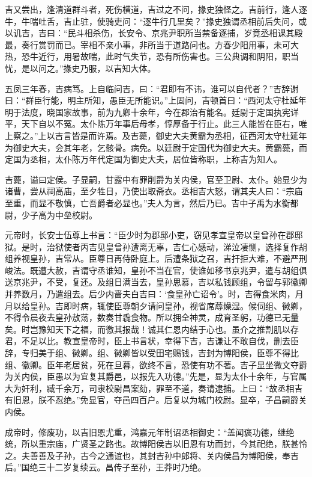 \documentclass[12pt,UTF8]{ctexbook}
\begin{document}
吉又尝出，逢清道群斗者，死伤横道，吉过之不问，掾史独怪之。吉前行，逢人逐牛，牛喘吐舌，吉止驻，使骑吏问：“逐牛行几里矣？”掾史独谓丞相前后失问，或以讥吉，吉曰：“民斗相杀伤，长安令、京兆尹职所当禁备逐捕，岁竟丞相课其殿最，奏行赏罚而已。宰相不亲小事，非所当于道路问也。方春少阳用事，未可大热，恐牛近行，用暑故喘，此时气失节，恐有所伤害也。三公典调和阴阳，职当忧，是以问之。”掾史乃服，以吉知大体。



五凤三年春，吉病笃。上自临问吉，曰：“君即有不讳，谁可以自代者？”吉辞谢曰：“群臣行能，明主所知，愚臣无所能识。”上固问，吉顿首曰：“西河太守杜延年明于法度，晓国家故事，前为九卿十余年，今在郡治有能名。廷尉于定国执宪详平，天下自以不冤。太仆陈万年事后母孝，惇厚备于行止。此三人能皆在臣右，唯上察之。”上以吉言皆是而许焉。及吉薨，御史大夫黄霸为丞相，征西河太守杜延年为御史大夫，会其年老，乞骸骨。病免。以廷尉于定国代为御史大夫。黄霸薨，而定国为丞相，太仆陈万年代定国为御史大夫，居位皆称职，上称吉为知人。



吉薨，谥曰定侯。子显嗣，甘露中有罪削爵为关内侯，官至卫尉、太仆。始显少为诸曹，尝从祠高庙，至夕牲日，乃使出取斋衣。丞相吉大怒，谓其夫人曰：“宗庙至重，而显不敬慎，亡吾爵者必显也。”夫人为言，然后乃已。吉中子禹为水衡都尉，少子高为中垒校尉。



元帝时，长安士伍尊上书言：“臣少时为郡邸小吏，窃见孝宣皇帝以皇曾孙在郡邸狱。是时，治狱使者丙吉见皇曾孙遭离无辜，吉仁心感动，涕泣凄恻，选择复作胡组养视皇孙，吉常从。臣尊日再侍卧庭上。后遭条狱之召，吉扞拒大难，不避严刑峻法。既遭大赦，吉谓守丞谁知，皇孙不当在官，使谁如移书京兆尹，遣与胡组俱送京兆尹，不受，复还。及组日满当去，皇孙思慕，吉以私钱顾组，令留与郭徽卿并养数月，乃遣组去。后少内啬夫白吉曰：‘食皇孙亡诏令’。时，吉得食米肉，月月以给皇孙。吉即时病，辄使臣尊朝夕请问皇孙，视省席蓐燥湿。候伺组、徽卿，不得令晨夜去皇孙敖荡，数奏甘毳食物。所以拥全神灵，成育圣躬，功德已无量矣。时岂豫知天下之福，而徼其报哉！诚其仁恩内结于心也。虽介之推割肌以存君，不足以比。教宣皇帝时，臣上书言状，幸得下吉，吉谦让不敢自伐，删去臣辞，专归美于组、徽卿。组、徽卿皆以受田宅赐钱，吉封为博阳侯，臣尊不得比组、徽卿。臣年老居贫，死在旦暮，欲终不言，恐使有功不著。吉子显坐微文夺爵为关内侯，臣愚以为宜复其爵邑，以报先入功德。”先是，显为太仆十余年，与官属大为奸利，臧千余万，司隶校尉昌案劾，罪至不道，奏请逮捕。上曰：“故丞相吉有旧恩，朕不忍绝。”免显官，夺邑四百户。后复以为城门校尉。显卒，子昌嗣爵关内侯。



成帝时，修废功，以吉旧恩尤重，鸿嘉元年制诏丞相御史：“盖闻褒功德，继绝统，所以重宗庙，广贤圣之路也。故博阳侯吉以旧恩有功而封，今其祀绝，朕甚怜之。夫善善及子孙，古今之通谊也，其封吉孙中郎将、关内侯昌为博阳侯，奉吉后。”国绝三十二岁复续云。昌传子至孙，王莽时乃绝。
\end{document}
